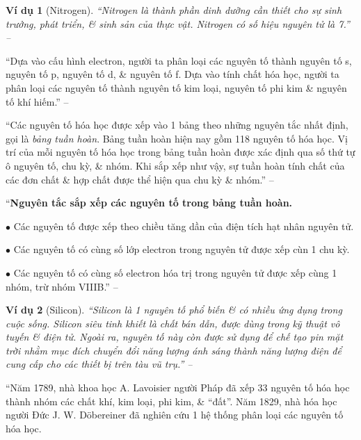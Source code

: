 \documentclass[oneside]{book}
\numberwithin{equation}{section}
\newtheorem{vidu}{Ví dụ}[section]
\begin{document}
\begin{vidu}[Nitrogen]
	``Nitrogen là thành phần dinh dưỡng cần thiết cho sự sinh trưởng, phát triển, \& sinh sản của thực vật. Nitrogen có số hiệu nguyên tử là 7.'' -- \cite[p. 40]{SGK_Hoa_Hoc_10_Chan_Troi_Sang_Tao}
\end{vidu}
``Dựa vào cấu hình electron, người ta phân loại các nguyên tố thành nguyên tố s, nguyên tố p, nguyên tố d, \& nguyên tố f. Dựa vào tính chất hóa học, người ta phân loại các nguyên tố thành nguyên tố kim loại, nguyên tố phi kim \& nguyên tố khí hiếm.'' -- \cite[p. 40]{SGK_Hoa_Hoc_10_Chan_Troi_Sang_Tao}

``Các nguyên tố hóa học được xếp vào 1 bảng theo những nguyên tắc nhất định, gọi là \textit{bảng tuần hoàn}. Bảng tuần hoàn hiện nay gồm 118 nguyên tố hóa học. Vị trí của mỗi nguyên tố hóa học trong bảng tuần hoàn được xác định qua số thứ tự ô nguyên tố, chu kỳ, \& nhóm. Khi sắp xếp như vậy, sự tuần hoàn tính chất của các đơn chất \& hợp chất được thể hiện qua chu kỳ \& nhóm.'' -- \cite[p. 40]{SGK_Hoa_Hoc_10_Chan_Troi_Sang_Tao}

``\textbf{Nguyên tắc sắp xếp các nguyên tố trong bảng tuần hoàn.}
\begin{enumerate*}
	\item[$\bullet$] Các nguyên tố được xếp theo chiều tăng dần của điện tích hạt nhân nguyên tử.
	\item[$\bullet$] Các nguyên tố có cùng số lớp electron trong nguyên tử được xếp cùn 1 chu kỳ.
	\item[$\bullet$] Các nguyên tố có cùng số electron hóa trị trong nguyên tử được xếp cùng 1 nhóm, trừ nhóm VIIIB.'' -- \cite[p. 40]{SGK_Hoa_Hoc_10_Chan_Troi_Sang_Tao}
\end{enumerate*}

\begin{vidu}[Silicon]
	``Silicon là 1 nguyên tố phổ biến \& có nhiều ứng dụng trong cuộc sống. Silicon siêu tinh khiết là chất bán dẫn, được dùng trong kỹ thuật vô tuyến \& điện tử. Ngoài ra, nguyên tố này còn được sử dụng để chế tạo pin mặt trời nhằm mục đích chuyển đổi năng lượng ánh sáng thành năng lượng điện để cung cấp cho các thiết bị trên tàu vũ trụ.'' -- \cite[p. 40]{SGK_Hoa_Hoc_10_Chan_Troi_Sang_Tao}
\end{vidu}
``Năm 1789, nhà khoa học A. Lavoisier người Pháp đã xếp 33 nguyên tố hóa học thành nhóm các chất khí, kim loại, phi kim, \& ``đất''. Năm 1829, nhà hóa học người Đức J. W. D\"obereiner đã nghiên cứu 1 hệ thống phân loại các nguyên tố hóa học.
\end{document}
